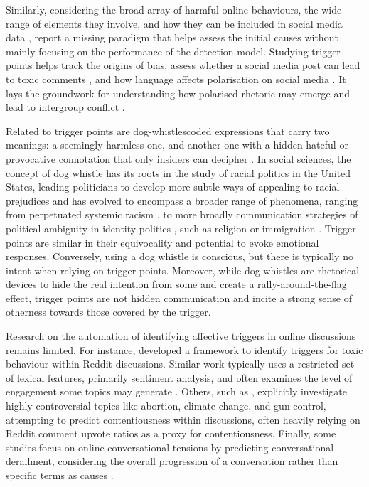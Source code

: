 Similarly, considering the broad array of harmful online behaviours, the wide range of elements they involve, and how they can be included in social media data \cite{olteanu2019social}, \citet{blodgett-etal-2020-language2} report a missing paradigm that helps assess the initial causes without mainly focusing on the performance of the detection model. Studying trigger points helps track the origins of bias, assess whether a social media post can lead to toxic comments \cite{dahiya2021would}, and how language affects polarisation on social media \cite{Karjus2024}. It lays the groundwork for understanding how polarised rhetoric may emerge and lead to intergroup conflict \cite{Almog22}.


Related to trigger points are dog-whistles\textemdash coded expressions that carry two meanings: a seemingly harmless one, and another one with a hidden hateful or provocative connotation that only insiders can decipher \cite{breitholtz-cooper-2021-dogwhistles2}. In social sciences, the concept of dog whistle has its roots in the study of racial politics in the United States, leading politicians to develop more subtle ways of appealing to racial prejudices \cite{lopez2013dog} and has evolved to encompass a broader range of phenomena, ranging from perpetuated systemic racism \cite{Filimon03032024}, to more broadly communication strategies of political ambiguity in identity politics \cite{Tolvanen24}, such as religion \cite{perry2023mating} or immigration \cite{filimon2016dog}. Trigger points are similar in their equivocality and potential to evoke emotional responses. Conversely, using a dog whistle is conscious, but there is typically no intent when relying on trigger points. Moreover, while dog whistles are rhetorical devices to hide the real intention from some and create a rally-around-the-flag effect, trigger points are not hidden communication and incite a strong sense of otherness towards those covered by the trigger. 

Research on the automation of identifying affective triggers in online discussions remains limited. For instance, \citet{almerekhi2022provoke} developed a framework to identify triggers for toxic behaviour within Reddit discussions. Similar work typically uses a restricted set of lexical features, primarily sentiment analysis, and often examines the level of engagement some topics may generate \cite{aldous2023really}. Others, such as \citet{beel2022linguistic}, explicitly investigate highly controversial topics like abortion, climate change, and gun control, attempting to predict contentiousness within discussions, often heavily relying on Reddit comment upvote ratios as a proxy for contentiousness.
Finally, some studies focus on online conversational tensions by predicting conversational derailment, considering the overall progression of a conversation rather than specific terms as causes \cite{zhang2018conversations,hessel2019something}.


